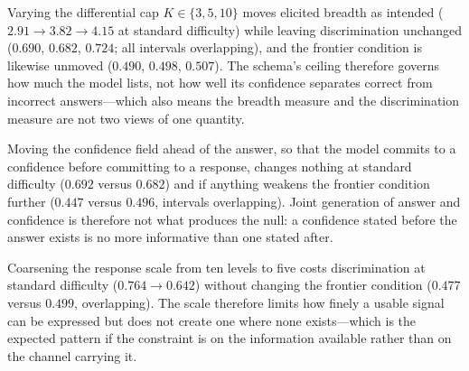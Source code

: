 \documentclass[journal,twoside]{IEEEtran}
\begin{document}
Varying the differential cap $K \in \{3,5,10\}$ moves elicited breadth as intended
($2.91 \to 3.82 \to 4.15$ at standard difficulty) while leaving discrimination unchanged
($0.690$, $0.682$, $0.724$; all intervals overlapping), and the frontier condition is likewise
unmoved ($0.490$, $0.498$, $0.507$). The schema's ceiling therefore governs how much the model
lists, not how well its confidence separates correct from incorrect answers---which also means the
breadth measure and the discrimination measure are not two views of one quantity.

Moving the confidence field ahead of the answer, so that the model commits to a confidence before
committing to a response, changes nothing at standard difficulty ($0.692$ versus $0.682$) and if
anything weakens the frontier condition further ($0.447$ versus $0.496$, intervals overlapping).
Joint generation of answer and confidence is therefore not what produces the null: a confidence
stated before the answer exists is no more informative than one stated after.

Coarsening the response scale from ten levels to five costs discrimination at standard difficulty
($0.764 \to 0.642$) without changing the frontier condition ($0.477$ versus $0.499$, overlapping).
The scale therefore limits how finely a usable signal can be expressed but does not create one where
none exists---which is the expected pattern if the constraint is on the information available rather
than on the channel carrying it.
\end{document}
